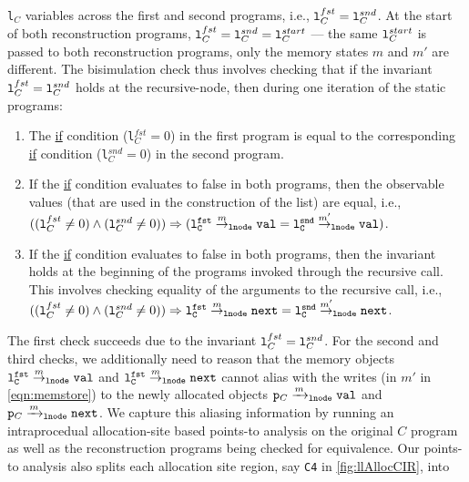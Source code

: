 {\tt l}$_C$ variables across the first and second
programs, i.e.,
${\tt l}^{fst}_C={\tt l}^{snd}_C$.
At the start of
both reconstruction
programs, ${\tt l}^{fst}_C={\tt l}^{snd}_C={\tt l}^{start}_C$
--- the
same ${\tt l}^{start}_C$ is passed to both reconstruction
programs, only the memory states $m$ and $m'$ are different.
The bisimulation check thus involves checking that
if the invariant
${\tt l}^{fst}_C={\tt l}^{snd}_C$
holds at the recursive-node,
then during one iteration of the static programs:
\vspace{-10px}
\begin{enumerate}
\setlength{\itemsep}{0px}
\item The \underline{if} condition
({\tt l$^{fst}_C=0$}) in the first program
is equal to the corresponding \underline{if}
condition ({\tt l$^{snd}_C=0$}) in the
second program.
\item If the \underline{if} condition
evaluates to false in both programs, then
the observable values (that are used in the
construction of the list) are equal, i.e.,
$(({\tt l}^{fst}_C\neq 0)\land({\tt l}^{snd}_C\neq 0))\Rightarrow ({\tt {\tt l}^{fst}_C} \overset{m}{\rightarrow}_{\tt lnode} {\tt val}=
{\tt {\tt l}^{snd}_C} \overset{m'}{\rightarrow}_{\tt lnode} {\tt val})$.
\item If the \underline{if} condition
evaluates to false in both programs, then
the invariant holds at the beginning
of the programs invoked through the
recursive call.
This involves checking equality
of the arguments to the recursive call, i.e.,
$(({\tt l}^{fst}_C\neq 0)\land({\tt l}^{snd}_C\neq 0))\Rightarrow {\tt {\tt l}^{fst}_C} \overset{m}{\rightarrow}_{\tt lnode} {\tt next}
=
{\tt {\tt l}^{snd}_C} \overset{m'}{\rightarrow}_{\tt lnode} {\tt next}$.
\end{enumerate}
\vspace{-7px}
The first check succeeds due to the invariant
${\tt l}^{fst}_C={\tt l}^{snd}_C$.
For the second and third checks, we additionally
need to reason that the memory objects
${\tt {\tt l}^{fst}_C} \overset{m}{\rightarrow}_{\tt lnode} {\tt val}$ and
${\tt {\tt l}^{fst}_C} \overset{m}{\rightarrow}_{\tt lnode} {\tt next}$ cannot
alias with the writes (in $m'$ in \cref{eqn:memstore})
to the newly allocated objects
${\tt p}_C\xrightarrow[]{m}_{\mathrm{\tt lnode}}{\tt val}$
and
${\tt p}_C\xrightarrow[]{m}_{\mathrm{\tt lnode}}{\tt next}$.
We capture this aliasing information by running an intraprocedual allocation-site based points-to analysis on
the original $C$ program as well as the reconstruction programs being checked
for equivalence. Our points-to analysis also splits each allocation site region, say {\tt C4} in \cref{fig:llAllocCIR}, into
